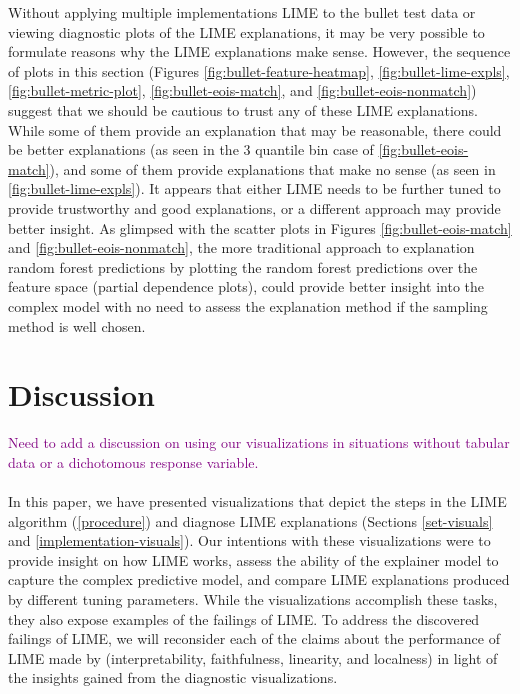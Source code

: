 \documentclass[AMS,STIX2COL]{WileyNJD-v2}\usepackage[]{graphicx}\usepackage[]{color}
\newcommand{\kgc}[1]{\textcolor{purple}{#1}}
\begin{document}
{Without applying multiple implementations LIME to the bullet test data or viewing diagnostic plots of the LIME explanations, it may be very possible to formulate reasons why the LIME explanations make sense. However, the sequence of plots in this section (Figures \ref{fig:bullet-feature-heatmap}, \ref{fig:bullet-lime-expls}, \ref{fig:bullet-metric-plot}, \ref{fig:bullet-eois-match}, and \ref{fig:bullet-eois-nonmatch}) suggest that we should be cautious to trust any of these LIME explanations. While some of them provide an explanation that may be reasonable, there could be better explanations (as seen in the 3 quantile bin case of \autoref{fig:bullet-eois-match}), and some of them provide explanations that make no sense (as seen in \autoref{fig:bullet-lime-expls}). It appears that either LIME needs to be further tuned to provide trustworthy and good explanations, or a different approach may provide better insight. As glimpsed with the scatter plots in Figures \ref{fig:bullet-eois-match} and \ref{fig:bullet-eois-nonmatch}, the more traditional approach to explanation random forest predictions by plotting the random forest predictions over the feature space (partial dependence plots), could provide better insight into the complex model with no need to assess the explanation method if the sampling method is well chosen.

\section{Discussion} \label{discussion}

\kgc{Need to add a discussion on using our visualizations in situations without tabular data or a dichotomous response variable.}\\
\\
In this paper, we have presented visualizations that depict the steps in the LIME algorithm (\autoref{procedure}) and diagnose LIME explanations (Sections \ref{set-visuals} and \ref{implementation-visuals}). Our intentions with these visualizations were to provide insight on how LIME works, assess the ability of the explainer model to capture the complex predictive model, and compare LIME explanations produced by different tuning parameters. While the visualizations accomplish these tasks, they also expose examples of the failings of LIME. To address the discovered failings of LIME, we will reconsider each of the claims about the performance of LIME made by \citep{ribeiro:2016} (interpretability, faithfulness, linearity, and localness) in light of the insights gained from the diagnostic visualizations.

}
\end{document}
